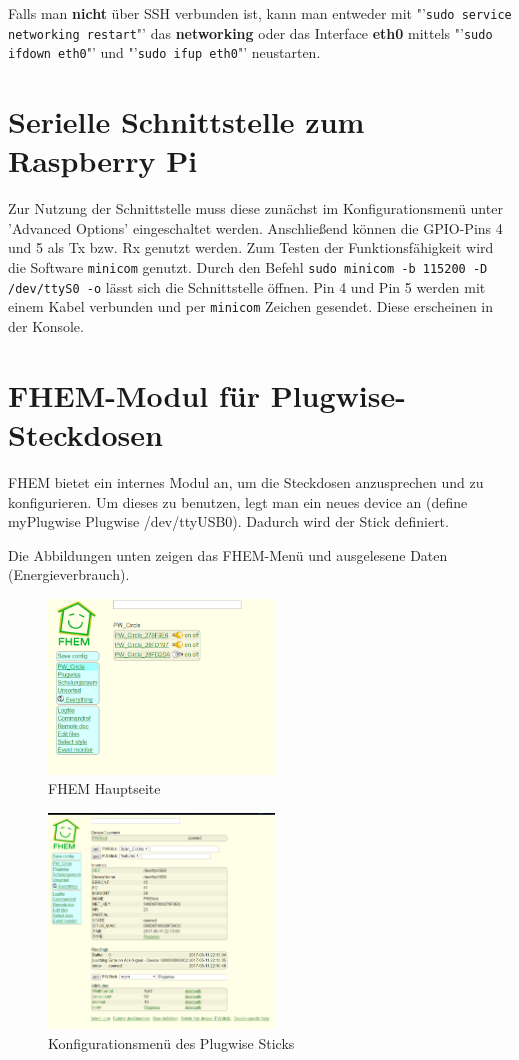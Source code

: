 \documentclass[enabledeprecatedfontcommands,12pt,oneside,pdftex]{scrbook}
\begin{document}
Falls man \textbf{nicht} über SSH verbunden ist, kann man entweder mit "'\texttt{sudo service networking restart}"' das \textbf{networking} oder das Interface \textbf{eth0} mittels "'\texttt{sudo ifdown eth0}"' und "'\texttt{sudo ifup eth0}"' neustarten.


\section{Serielle Schnittstelle zum Raspberry Pi}

Zur Nutzung der Schnittstelle muss diese zunächst im Konfigurationsmenü unter 'Advanced Options' eingeschaltet werden. Anschließend können die GPIO-Pins 4 und 5 als Tx bzw. Rx genutzt werden. Zum Testen der Funktionsfähigkeit wird die Software \texttt{minicom} genutzt. Durch den Befehl \texttt{sudo minicom -b 115200 -D /dev/ttyS0 -o} lässt sich die Schnittstelle öffnen. Pin 4 und Pin 5 werden mit einem Kabel verbunden und per \texttt{minicom} Zeichen gesendet. Diese erscheinen in der Konsole.



\section{FHEM-Modul für Plugwise-Steckdosen}
FHEM bietet ein internes Modul an, um die Steckdosen anzusprechen und zu konfigurieren. Um dieses zu benutzen, legt man ein neues device an (define myPlugwise Plugwise /dev/ttyUSB0). Dadurch wird der Stick definiert.


Die Abbildungen unten zeigen das FHEM-Menü und ausgelesene Daten (Energieverbrauch).\newline

\begin{figure}[H]
  \caption{FHEM Hauptseite}
  \centering
  \includegraphics[width=6cm]{Home1}
\end{figure}

\begin{figure}[H]
  \caption{Konfigurationsmenü des Plugwise Sticks}
  \centering
  \includegraphics[width=6cm]{PWStick}
\end{figure}
\end{document}
